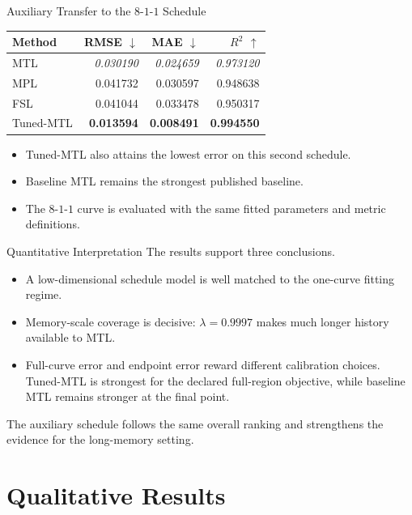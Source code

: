 \documentclass[aspectratio=169]{beamer}
\newcommand{\best}[1]{\textbf{#1}}
\newcommand{\second}[1]{\emph{#1}}
\begin{document}
\begin{frame}{Auxiliary Transfer to the \(8\)-\(1\)-\(1\) Schedule}
  \begin{center}
  \begin{tabular}{lrrr}
    \toprule
    Method & RMSE \(\downarrow\) & MAE \(\downarrow\) & \(R^2\) \(\uparrow\) \\
    \midrule
    MTL & \second{0.030190} & \second{0.024659} & \second{0.973120} \\
    MPL & 0.041732 & 0.030597 & 0.948638 \\
    FSL & 0.041044 & 0.033478 & 0.950317 \\
    \midrule
    Tuned-MTL & \best{0.013594} & \best{0.008491} & \best{0.994550} \\
    \bottomrule
  \end{tabular}
  \end{center}
  \begin{itemize}
    \item Tuned-MTL also attains the lowest error on this second schedule.
    \item Baseline MTL remains the strongest published baseline.
    \item The \(8\)-\(1\)-\(1\) curve is evaluated with the same fitted parameters and metric definitions.
  \end{itemize}
\end{frame}

\begin{frame}{Quantitative Interpretation}
  The results support three conclusions.
  \begin{itemize}
    \item A low-dimensional schedule model is well matched to the one-curve fitting regime.
    \item Memory-scale coverage is decisive: \(\lambda=0.9997\) makes much longer history available to MTL.
    \item Full-curve error and endpoint error reward different calibration choices. Tuned-MTL is strongest for the declared full-region objective, while baseline MTL remains stronger at the final point.
  \end{itemize}
  The auxiliary schedule follows the same overall ranking and strengthens the evidence for the long-memory setting.
\end{frame}

\section{Qualitative Results}
\end{document}
